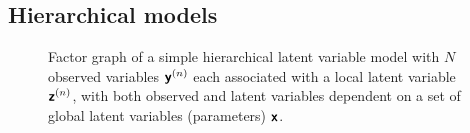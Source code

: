 









\subsection{Hierarchical models}\label{subsec:hierachical-models-intro}

\begin{figure}	
\centering
{}
\caption[Hierarchical latent variable model factor graph.]{Factor graph of a simple hierarchical latent variable model with $N$ observed variables $\boldsymbol{\mathsf{y}}^{(n)}$ each associated with a local latent variable $\boldsymbol{\mathsf{z}}^{(n)}$, with both observed and latent variables dependent on a set of global latent variables (parameters) $\boldsymbol{\mathsf{x}}$.}
\label{fig:hierarchical-latent-var-factor-graph}
\end{figure}

